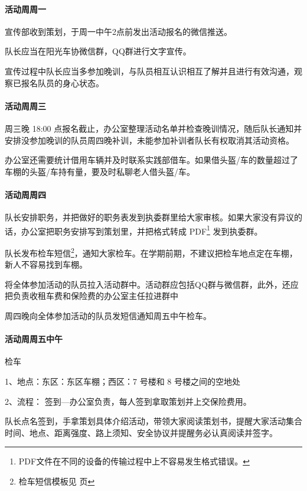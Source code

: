 \documentclass{ctexbook}
\begin{document}
\paragraph{活动周周一}

宣传部收到策划，于周一中午2点前发出活动报名的微信推送。

队长应当在阳光车协微信群，QQ群进行文字宣传。

宣传过程中队长应当多参加晚训，与队员相互认识相互了解并且进行有效沟通，观察已报名队员的身心状态。

\paragraph{活动周周三}

周三晚 18:00 点报名截止，办公室整理活动名单并检查晚训情况，随后队长通知并安排没参加晚训的队员周四晚补训，未能参加补训者队长有权取消其活动资格。

办公室还需要统计借用车辆并及时联系实践部借车。如果借头盔/车的数量超过了车棚的头盔/车持有量，要及时私聊老人借头盔/车。

\paragraph{活动周周四}

队长安排职务，并把做好的职务表发到执委群里给大家审核。如果大家没有异议的话，办公室把职务安排写到策划里，并把格式转成 PDF\footnote{PDF文件在不同的设备的传输过程中上不容易发生格式错误。} 发到执委群。



队长发布检车短信\footnote{检车短信模板见 \pageref{subsec:检车通知} 页}，通知大家检车。在学期前期，不建议把检车地点定在车棚，新人不容易找到车棚。

将全体参加活动的队员拉入活动群中。活动群应包括QQ群与微信群，此外，还应把负责收租车费和保险费的办公室主任拉进群中

周四晚向全体参加活动的队员发短信通知周五中午检车。

\paragraph{活动周周五中午}

检车

1、地点：东区：东区车棚；西区：7 号楼和 8 号楼之间的空地处

2、流程：
签到—办公室负责，每人签到拿取策划并上交保险费用。

队长点名签到，手拿策划具体介绍活动，带领大家阅读策划书，提醒大家活动集合时间、地点、距离强度、路上须知、安全协议并提醒务必认真阅读并签字。
\end{document}

